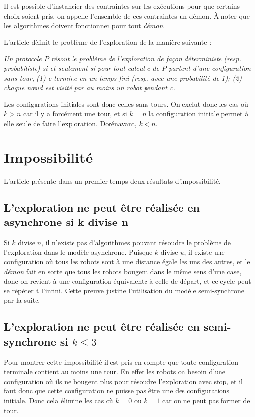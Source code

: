 \documentclass[11pt,letter]{../../pactole-git/tex/llncs} %
\begin{document}
Il est possible d'instancier des contraintes sur les exécutions pour que certains choix 
soient pris. on appelle l'ensemble de ces contraintes un démon.
À noter que les algorithmes doivent fonctionner pour tout \emph{démon}.

L'article définit le problème de l'exploration de la manière suivante :
\par\leavevmode\par 
\emph{Un protocole $P$ résout le problème de l'exploration de façon déterministe 
(resp. probabiliste) si et seulement si pour tout calcul c de $P$ partant d'une configuration
sans tour, (1) c termine en un temps fini (resp. avec une probabilité de 1); (2) chaque nœud
est visité par au moins un robot pendant c.}
\par\leavevmode\par 
Les configurations initiales sont donc celles sans tours.
On exclut donc les cas où $k > n$ car il y a forcément une tour, et si $k = n$ 
la configuration initiale permet à elle seule de faire l'exploration. Dorénavant, $k<n$.

\section{Impossibilité}

L'article présente dans un premier temps deux résultats d'impossibilité.

\subsection{L'exploration ne peut être réalisée en asynchrone si k divise n}

Si $k$ divise $n$, il n'existe pas d'algorithmes pouvant résoudre le problème de l'exploration
dans le modèle asynchrone. Puisque $k$ divise $n$, il existe une configuration où tous
les robots sont à une distance égale les uns des autres, et le \emph{démon} fait en sorte
que tous les robots bougent dans le même sens d'une case, donc on revient à une configuration  
équivalente à celle de départ, et ce cycle peut se répéter à l'infini. Cette preuve justifie 
l'utilisation du modèle semi-synchrone par la suite.

\subsection{L'exploration ne peut être réalisée en semi-synchrone si $k \le 3$}

Pour montrer cette impossibilité il est pris en compte que toute configuration terminale
contient au moins une tour. En effet les robots on besoin d'une configuration où ils ne bougent
plus pour résoudre l'exploration avec stop, et il faut donc que cette configuration ne puisse
pas être une des configurations initiale. Donc cela élimine les cas où $k=0$ ou $k=1$ car on
ne peut pas former de tour. 
\end{document}
